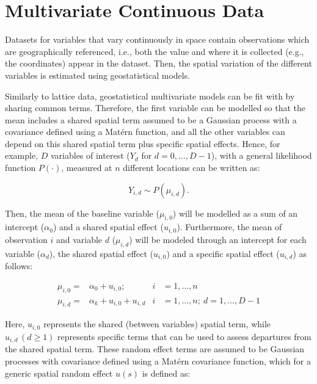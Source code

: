 







\section{Multivariate Continuous Data}
\label{sec:mgeo}


\medskip
Datasets for variables that vary continuously in space contain observations which are geographically referenced, i.e., both the value and where it is collected (e.g., the coordinates) appear in the dataset. Then, the spatial variation of the different variables is estimated using geostatistical models.




\medskip
Similarly to lattice data, geostatistical multivariate models can be fit with  by sharing common terms.  Therefore, the first variable can be modelled so that the mean includes a shared spatial term assumed to be a Gaussian process with a covariance defined using a Mat\'ern function, and all the other variables can depend on this shared spatial term plus specific spatial effects. Hence, for example, $D$ variables of interest ($Y_d$ for $d=0, \ldots, D-1$), with a general likelihood function $P(\cdot)$, measured at $n$ different locations can be written as: 

$$
Y_{i,d} \sim P(\mu_{i,d}) .
$$

Then, the mean of the baseline variable ($\mu_{i,0}$) will be modelled as a sum of an intercept ($\alpha_0$) and a shared spatial effect ($u_{i,0}$). Furthermore, the mean of observation $i$ and variable $d$ ($\mu_{i,d}$) will be modeled through an intercept for each variable ($\alpha_d$), the shared spatial effect ($u_{i,0}$) and a specific spatial effect ($u_{i,d}$) as follows:

\begin{align}
\mu_{i,0} =& \alpha_0 + u_{i,0};  &i&=1,\ldots,n\nonumber\\
\mu_{i,d} =& \alpha_k + u_{i,0} + u_{i,d}  &i&=1,\ldots,n;\ d=1,\ldots,D-1\nonumber
\end{align}


\noindent
Here, $u_{i,0}$ represents the shared (between variables) spatial term, while  $u_{i,d}\, (d\geq1)$ represents specific terms that can be used to assess departures from the shared spatial term. These random effect terms are assumed to be Gaussian processes with covariance defined using a Matérn covariance function, which for a generic spatial random effect $u(s)$ is defined as:


